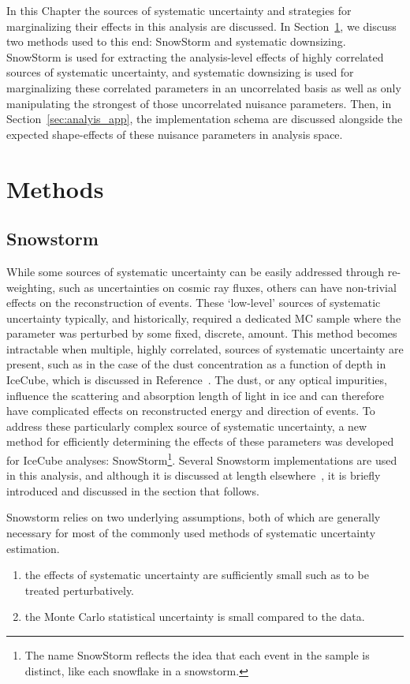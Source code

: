 \documentclass[main.tex]{subfiles}
\begin{document}
In this Chapter the sources of systematic uncertainty and strategies for marginalizing their effects in this analysis are discussed. 
In Section~\ref{sec:methods}, we discuss two methods used to this end: SnowStorm and systematic downsizing. 
SnowStorm is used for extracting the analysis-level effects of highly correlated sources of systematic uncertainty, and systematic downsizing is used for marginalizing these correlated parameters in an uncorrelated basis as well as only manipulating the strongest of those uncorrelated nuisance parameters. 
Then, in Section~\ref{sec:analyis_app}, the implementation schema are discussed alongside the expected shape-effects of these nuisance parameters in analysis space. 

\section{Methods}\label{sec:methods}
\subsection{Snowstorm}
While some sources of systematic uncertainty can be easily addressed through re-weighting, such as uncertainties on cosmic ray fluxes, others can have non-trivial effects on the reconstruction of events. 
These `low-level' sources of systematic uncertainty typically, and historically, required a dedicated MC sample where the parameter was perturbed by some fixed, discrete, amount. 
This method becomes intractable when multiple, highly correlated, sources of systematic uncertainty are present, such as in the case of the dust concentration as a function of depth in IceCube, which is discussed in Reference~\cite{Aartsen_2013}. 
The dust, or any optical impurities, influence the scattering and absorption length of light in ice and can therefore have complicated effects on reconstructed energy and direction of events.
To address these particularly complex source of systematic uncertainty, a new method for efficiently determining the effects of these parameters was developed for IceCube analyses: SnowStorm\footnote{The name SnowStorm reflects the idea that each event in the sample is distinct, like each snowflake in a snowstorm.}.
Several Snowstorm implementations are used in this analysis, and although it is discussed at length elsewhere~\cite{Aartsen_2019_snow}, it is briefly introduced and discussed in the section that follows. 

Snowstorm relies on two underlying assumptions, both of which are generally necessary for most of the commonly used methods of systematic uncertainty estimation.
\begin{enumerate}
    \item the effects of systematic uncertainty are sufficiently small such as to be treated perturbatively. 
    \item the Monte Carlo statistical uncertainty is small compared to the data.
\end{enumerate}
\end{document}
